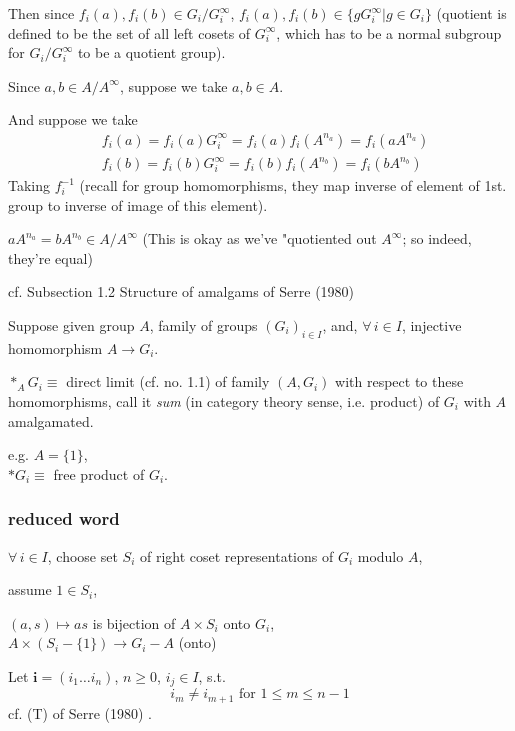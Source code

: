 Then since $f_i(a),f_i(b) \in G_i/G_i^{\infty}$, $f_i(a),f_i(b) \in \lbrace gG_i^{\infty} | g\in G_i \rbrace$ (quotient is defined to be the set of all left cosets of $G_i^{\infty}$, which has to be a normal subgroup for $G_i/G_i^{\infty}$ to be a quotient group).  

Since $a,b \in A/A^{\infty}$, suppose we take $a,b\in A$.  

And suppose we take 
\[
\begin{aligned}
& 	f_i(a) = f_i(a)G_i^{\infty} = f_i(a) f_i(A^{n_a} ) = f_i(aA^{n_a}) \\ 
& 	f_i(b) = f_i(b)G_i^{\infty} = f_i(b) f_i(A^{n_b} ) = f_i(bA^{n_b})  
\end{aligned}
\]
Taking $f_i^{-1}$ (recall for group homomorphisms, they map inverse of element of 1st. group to inverse of image of this element).  

$aA^{n_a}=bA^{n_b}\in A/A^{\infty}$ (This is okay as we've "quotiented out $A^{\infty}$; so indeed, they're equal)


cf. Subsection 1.2 Structure of amalgams of Serre (1980) \cite{agat:Serr1980} 

Suppose given group $A$, family of groups $(G_i)_{i\in I}$, and, $\forall \, i\in I$, injective homomorphism $A\to G_i$.  

$*_A G_i \equiv $ direct limit (cf. no. 1.1) of family $(A,G_i)$ with respect to these homomorphisms, call it \emph{sum} (in category theory sense, i.e. product) of $G_i$ with $A$ amalgamated.  

e.g. $A=\lbrace 1 \rbrace$, \\
$*G_i \equiv $ free product of $G_i$.  

\subsubsection{reduced word}  

$\forall \, i \in I$, choose set $S_i$ of right coset representations of $G_i$ modulo $A$, 

assume $1 \in S_i$, 

$(a,s)\mapsto as$ is bijection of $A\times S_i$ onto $G_i$,  \\
$A\times (S_i-\lbrace 1 \rbrace) \to G_i-A$ (onto)

Let $\mathbf{i} = (i_1\dots i_n)$, $n\geq 0$, $i_j \in I$, s.t. 
\begin{equation}
i_m \neq i_{m+1} \text{ for } 1 \leq m \leq n-1
\end{equation}
cf. (T) of Serre (1980) \cite{agat:Serr1980}.  

